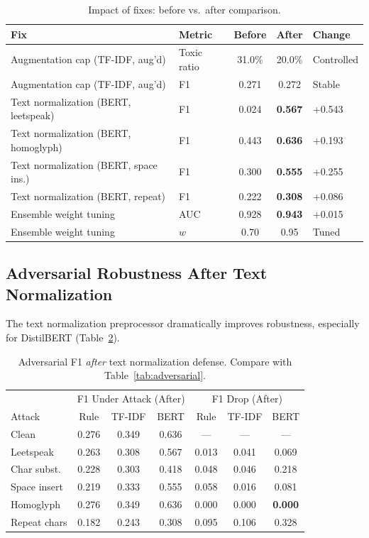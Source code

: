 \documentclass[11pt,a4paper]{article}
\begin{document}
\begin{table}[H]
\centering
\caption{Impact of fixes: before vs.\ after comparison.}
\label{tab:before_after}
\begin{tabular}{llccl}
\toprule
Fix & Metric & Before & After & Change \\
\midrule
Augmentation cap (TF-IDF, aug'd) & Toxic ratio & 31.0\% & 20.0\% & Controlled \\
Augmentation cap (TF-IDF, aug'd) & F1 & 0.271 & 0.272 & Stable \\
Text normalization (BERT, leetspeak) & F1 & 0.024 & \textbf{0.567} & +0.543 \\
Text normalization (BERT, homoglyph) & F1 & 0.443 & \textbf{0.636} & +0.193 \\
Text normalization (BERT, space ins.) & F1 & 0.300 & \textbf{0.555} & +0.255 \\
Text normalization (BERT, repeat) & F1 & 0.222 & \textbf{0.308} & +0.086 \\
Ensemble weight tuning & AUC & 0.928 & \textbf{0.943} & +0.015 \\
Ensemble weight tuning & $w$ & 0.70 & 0.95 & Tuned \\
\bottomrule
\end{tabular}
\end{table}

\subsection{Adversarial Robustness After Text Normalization}

The text normalization preprocessor dramatically improves robustness, especially for DistilBERT (Table~\ref{tab:adversarial_after}).

\begin{table}[H]
\centering
\caption{Adversarial F1 \emph{after} text normalization defense. Compare with Table~\ref{tab:adversarial}.}
\label{tab:adversarial_after}
\begin{tabular}{lccc|ccc}
\toprule
 & \multicolumn{3}{c|}{F1 Under Attack (After)} & \multicolumn{3}{c}{F1 Drop (After)} \\
Attack & Rule & TF-IDF & BERT & Rule & TF-IDF & BERT \\
\midrule
Clean         & 0.276 & 0.349 & 0.636 & ---   & ---   & --- \\
Leetspeak     & 0.263 & 0.308 & 0.567 & 0.013 & 0.041 & 0.069 \\
Char subst.   & 0.228 & 0.303 & 0.418 & 0.048 & 0.046 & 0.218 \\
Space insert  & 0.219 & 0.333 & 0.555 & 0.058 & 0.016 & 0.081 \\
Homoglyph     & 0.276 & 0.349 & 0.636 & 0.000 & 0.000 & \textbf{0.000} \\
Repeat chars  & 0.182 & 0.243 & 0.308 & 0.095 & 0.106 & 0.328 \\
\bottomrule
\end{tabular}
\end{table}
\end{document}
